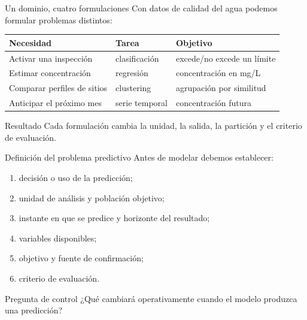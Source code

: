 \documentclass[aspectratio=169,10pt]{beamer}
\begin{document}
\begin{frame}{Un dominio, cuatro formulaciones}
  \small
  Con datos de calidad del agua podemos formular problemas distintos:
  \begin{tabularx}{\textwidth}{X p{} X}
    \toprule Necesidad & Tarea & Objetivo \\ \midrule
    Activar una inspección & clasificación & excede/no excede un límite \\
    Estimar concentración & regresión & concentración en mg/L \\
    Comparar perfiles de sitios & clustering & agrupación por similitud \\
    Anticipar el próximo mes & serie temporal & concentración futura \\
    \bottomrule
  \end{tabularx}
  \begin{block}{Resultado}
    Cada formulación cambia la unidad, la salida, la partición y el criterio de evaluación.
  \end{block}
\end{frame}

\begin{frame}{Definición del problema predictivo}
  \small
  Antes de modelar debemos establecer:
  \begin{enumerate}
    \item decisión o uso de la predicción;
    \item unidad de análisis y población objetivo;
    \item instante en que se predice y horizonte del resultado;
    \item variables disponibles;
    \item objetivo y fuente de confirmación;
    \item criterio de evaluación.
  \end{enumerate}
  \begin{block}{Pregunta de control}
    ¿Qué cambiará operativamente cuando el modelo produzca una predicción?
  \end{block}
\end{frame}
\end{document}
